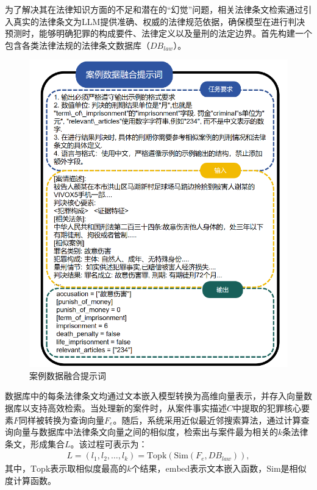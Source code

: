 为了解决其在法律知识方面的不足和潜在的“幻觉”问题，相关法律条文检索通过引入真实的法律条文为LLM提供准确、权威的法律规范依据，确保模型在进行判决预测时，能够明确犯罪的构成要件、法律定义以及量刑的法定边界。首先构建一个包含各类法律法规的法律条文数据库（$DB_{law}$​）。
\begin{figure}[H]
	\centering
	\includegraphics[width=1\linewidth]{fig/prompt2.2.pdf}
	\caption{案例数据融合提示词
	}
	\label{fig:prompt2}
\end{figure}
数据库中的每条法律条文均通过文本嵌入模型转换为高维向量表示，并存入向量数据库以支持高效检索。当处理新的案件时，从案件事实描述$C$中提取的犯罪核心要素$F$同样被转换为查询向量$F_{e}$。随后，系统采用近似最近邻搜索算法，通过计算查询向量与数据库中法律条文向量之间的相似度，检索出与案件最为相关的$k$条法律条文，形成集合$L$。该过程可表示为：
\begin{equation}
	\begin{aligned}
		L  =(l_1​,l_2​,\dots,l_k​)
		=\text{Topk}​(\text{Sim}(F_{e},DB_{law})),
	\end{aligned}
	\label{eq:L}
\end{equation}
其中，$\text{Topk}​$表示取相似度最高的$k$个结果，$\text{embed}$表示文本嵌入函数，$\text{Sim}$是相似度计算函数。
